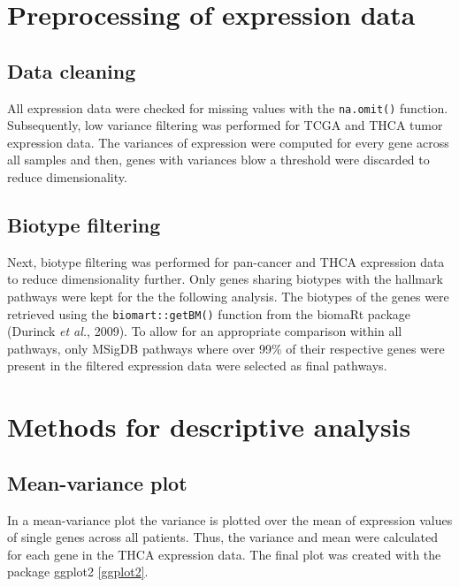\documentclass[
  parskip,
  oneside]{scrreprt}
\begin{document}
\hypertarget{preprocessing-of-expression-data}{%
\section{Preprocessing of expression
data}\label{preprocessing-of-expression-data}}

\hypertarget{data-cleaning}{%
\subsection{Data cleaning}\label{data-cleaning}}

All expression data were checked for missing values with the
\texttt{na.omit()} function. Subsequently, low variance filtering was
performed for TCGA and THCA tumor expression data. The variances of
expression were computed for every gene across all samples and then,
genes with variances blow a threshold were discarded to reduce
dimensionality.

\hypertarget{biotype-filtering}{%
\subsection{Biotype filtering}\label{biotype-filtering}}

Next, biotype filtering was performed for pan-cancer and THCA expression
data to reduce dimensionality further. Only genes sharing biotypes with
the hallmark pathways were kept for the the following analysis. The
biotypes of the genes were retrieved using the \texttt{biomart::getBM()}
function from the biomaRt package (Durinck \emph{et al.}, 2009). To
allow for an appropriate comparison within all pathways, only MSigDB
pathways where over 99\% of their respective genes were present in the
filtered expression data were selected as final pathways.

\hypertarget{methods-for-descriptive-analysis}{%
\section{Methods for descriptive
analysis}\label{methods-for-descriptive-analysis}}

\hypertarget{mean-variance-plot}{%
\subsection{Mean-variance plot}\label{mean-variance-plot}}

In a mean-variance plot the variance is plotted over the mean of
expression values of single genes across all patients. Thus, the
variance and mean were calculated for each gene in the THCA expression
data. The final plot was created with the package ggplot2 \ref{ggplot2}.
\end{document}
